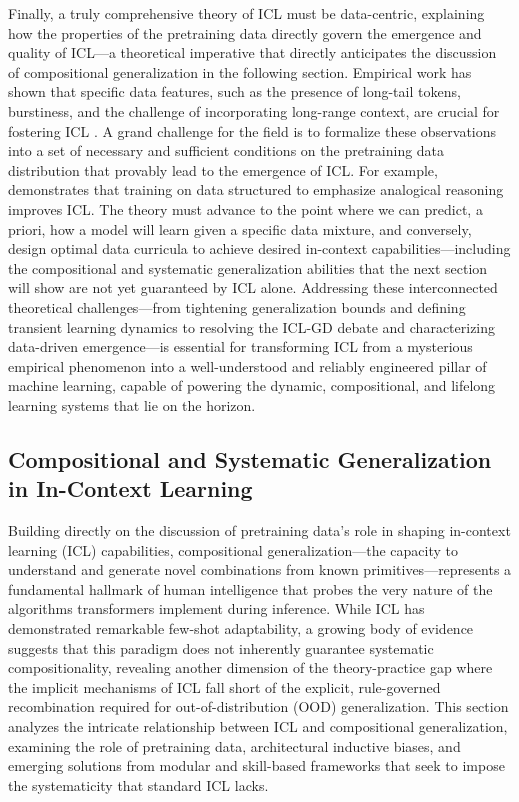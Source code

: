 \documentclass[11pt]{article}
\begin{document}
Finally, a truly comprehensive theory of ICL must be data-centric, explaining how the properties of the pretraining data directly govern the emergence and quality of ICL---a theoretical imperative that directly anticipates the discussion of compositional generalization in the following section. Empirical work has shown that specific data features, such as the presence of long-tail tokens, burstiness, and the challenge of incorporating long-range context, are crucial for fostering ICL \cite{ref41}. A grand challenge for the field is to formalize these observations into a set of necessary and sufficient conditions on the pretraining data distribution that provably lead to the emergence of ICL. For example, \cite{ref190} demonstrates that training on data structured to emphasize analogical reasoning improves ICL. The theory must advance to the point where we can predict, a priori, how a model will learn given a specific data mixture, and conversely, design optimal data curricula to achieve desired in-context capabilities---including the compositional and systematic generalization abilities that the next section will show are not yet guaranteed by ICL alone. Addressing these interconnected theoretical challenges---from tightening generalization bounds and defining transient learning dynamics to resolving the ICL-GD debate and characterizing data-driven emergence---is essential for transforming ICL from a mysterious empirical phenomenon into a well-understood and reliably engineered pillar of machine learning, capable of powering the dynamic, compositional, and lifelong learning systems that lie on the horizon.

\subsection{Compositional and Systematic Generalization in In-Context Learning}

Building directly on the discussion of pretraining data's role in shaping in-context learning (ICL) capabilities, compositional generalization---the capacity to understand and generate novel combinations from known primitives---represents a fundamental hallmark of human intelligence that probes the very nature of the algorithms transformers implement during inference. While ICL has demonstrated remarkable few-shot adaptability, a growing body of evidence suggests that this paradigm does not inherently guarantee systematic compositionality, revealing another dimension of the theory-practice gap where the implicit mechanisms of ICL fall short of the explicit, rule-governed recombination required for out-of-distribution (OOD) generalization. This section analyzes the intricate relationship between ICL and compositional generalization, examining the role of pretraining data, architectural inductive biases, and emerging solutions from modular and skill-based frameworks that seek to impose the systematicity that standard ICL lacks.
\end{document}
